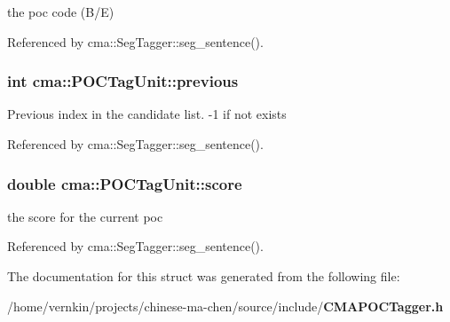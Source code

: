 the poc code (B/E) 

Referenced by cma::SegTagger::seg\_\-sentence().
\subsubsection[{previous}]{\setlength{\rightskip}{0pt plus 5cm}int {\bf cma::POCTagUnit::previous}}\label{structcma_1_1POCTagUnit_65a1e27d97dfa822fee58fbe3dc2a2a3}


Previous index in the candidate list. -1 if not exists 

Referenced by cma::SegTagger::seg\_\-sentence().
\subsubsection[{score}]{\setlength{\rightskip}{0pt plus 5cm}double {\bf cma::POCTagUnit::score}}\label{structcma_1_1POCTagUnit_dee6f742a3e599ee2093d224d447832f}


the score for the current poc 

Referenced by cma::SegTagger::seg\_\-sentence().

The documentation for this struct was generated from the following file:\begin{CompactItemize}
\item 
/home/vernkin/projects/chinese-ma-chen/source/include/{\bf CMAPOCTagger.h}\end{CompactItemize}
